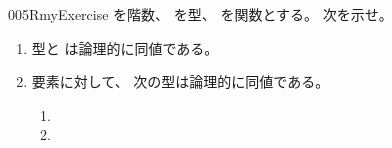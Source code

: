 \documentclass[index]{subfiles}
\begin{document}
\begin{myBlock}{005R}{myExercise}
  を階数、
  を型、
  を関数とする。
  次を示せ。
  \begin{enumerate}
  \item \label{005R:0000}
    型と
    は論理的に同値である。
  \item \label{005R:0001}
    要素に対して、
    次の型は論理的に同値である。
    \begin{enumerate}
    \item {}
    \item {}
    \end{enumerate}
  \end{enumerate}
\end{myBlock}
\end{document}
